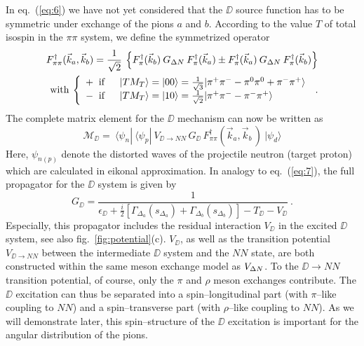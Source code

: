 In eq.\ (\ref{eq:6}) we have not yet considered that the $\DD$
source function has to be symmetric under exchange of the pions $a$ and $b$.
According to the value $T$ of total isospin in the $\pi\pi$ system, 
we define the symmetrized operator
%
\begin{eqnarray}
  \label{eq:8}
  F_{\pi\pi}^\dagger (\vec k_a, \vec k_b) = \frac{1}{\sqrt{2}} \: \left\{
  F_\pi^{\dagger} (\vec k_b) \: G_{\Delta N} \: F_\pi^{\dagger} (\vec k_a)
  \pm F_\pi^{\dagger} (\vec k_a) \: G_{\Delta N} \: F_\pi^{\dagger} (\vec k_b) \right\} \\
  \nonumber 
  \text{with} \: \left\{ 
  \begin{array}{ll} 
    + \;\; \text{if} & \;\; | T M_T \rangle = | 00 \rangle
        = \frac{1}{\sqrt{3}} | \pi^+ \pi^- - \pi^0\pi^0 + \pi^- \pi^+ \rangle \\ 
    - \;\; \text{if} & \;\; | T M_T \rangle = | 10 \rangle
        = \frac{1}{\sqrt{2}} | \pi^+ \pi^- - \pi^- \pi^+ \rangle
  \end{array} \right. \: .
\end{eqnarray}
%
The complete matrix element for the $\DD$ mechanism can now be written as
%
\begin{equation}
  \label{eq:9}
  {\mathcal M}_\DD = \: \langle \psi_n | \: \langle \psi_p | 
  \: V_{\DD \to NN} \, G_\DD \, F^\dagger_{\pi\pi} (\vec k_a, \vec k_b \,) 
  \: | \psi_d \rangle
\end{equation}
%
Here, $\psi_{n(p)}$ denote the distorted waves 
of the projectile neutron (target proton) which are calculated in 
eikonal approximation.
In analogy to eq.\ (\ref{eq:7}), the full propagator for the $\DD$ system
is given by
%
\begin{equation}
  G_\DD = \frac{1}{ \epsilon_\DD + \frac{i}{2} \left[ \Gamma_{\Delta_a} (s_{\Delta_a})
    + \Gamma_{\Delta_b} (s_{\Delta_b}) \right] - T_\DD - V_\DD } \: .
\end{equation}
%
Especially, this propagator includes the residual interaction $V_\DD$ 
in the excited $\DD$ system, see also fig.\ \ref{fig:potential}(c).
$V_\DD$, as well as the transition potential $V_{\DD \to NN}$ between
the intermediate $\DD$ system and the $NN$ state, are both constructed
within the same meson exchange model as $V_{\Delta N}$. 
To the $\DD \to NN$ transition potential, of course, only the $\pi$
and $\rho$ meson exchanges contribute. The $\DD$ excitation can thus
be separated into a spin--longitudinal part (with $\pi$--like 
coupling to $NN$) and a spin--transverse part (with $\rho$--like
coupling to $NN$). As we will demonstrate later, this spin--structure
of the $\DD$ excitation is important for the angular distribution of the pions.




